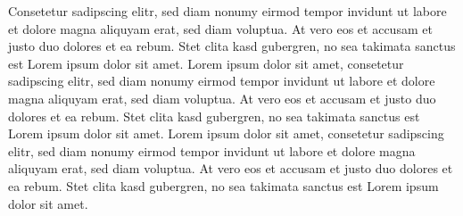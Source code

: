 \documentclass[12pt,a4paper,twoside]{report}
\begin{document}
Consetetur sadipscing elitr, sed diam nonumy eirmod tempor invidunt ut
labore et dolore magna aliquyam erat, sed diam voluptua. At vero eos
et accusam et justo duo dolores et ea rebum. Stet clita kasd
gubergren, no sea takimata sanctus est Lorem ipsum dolor sit amet.
Lorem ipsum dolor sit amet, consetetur sadipscing elitr, sed diam
nonumy eirmod tempor invidunt ut labore et dolore magna aliquyam erat,
sed diam voluptua. At vero eos et accusam et justo duo dolores et ea
rebum. Stet clita kasd gubergren, no sea takimata sanctus est Lorem
ipsum dolor sit amet. Lorem ipsum dolor sit amet, consetetur
sadipscing elitr, sed diam nonumy eirmod tempor invidunt ut labore et
dolore magna aliquyam erat, sed diam voluptua. At vero eos et accusam
et justo duo dolores et ea rebum. Stet clita kasd gubergren, no sea
takimata sanctus est Lorem ipsum dolor sit amet.

\label{lastpage}
\end{document}
